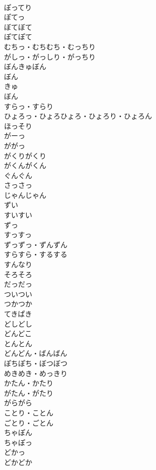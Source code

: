 \documentclass[8pt]{extreport}
\begin{document}
\begin{CJK}{UTF8}{min}
\\	ぽってり	
\\	ぽてっ	
\\	ぼてぼて	
\\	ぽてぽて	
\\	むちっ・むちむち・むっちり	
\\	がしっ・がっしり・がっちり	
\\	ぼんきゅぼん	
\\	ぼん 
\\	きゅ 
\\	ぼん 
\\	すらっ・すらり	
\\	ひょろっ・ひょろひょろ・ひょろり・ひょろん	
\\	ほっそり	
\\	がーっ	
\\	ががっ	
\\	がくりがくり	
\\	がくんがくん	
\\	ぐんぐん	
\\	さっさっ	
\\	じゃんじゃん	
\\	ずい	
\\	すいすい	
\\	ずっ	
\\	すっすっ	
\\	ずっずっ・ずんずん	
\\	すらすら・するする	
\\	すんなり	
\\	そろそろ	
\\	だっだっ	
\\	ついつい	
\\	つかつか	
\\	てきぱき	
\\	どしどし	
\\	どんどこ	
\\	とんとん	
\\	どんどん・ばんばん	
\\	ぽちぽち・ぼつぼつ	
\\	めきめき・めっきり	
\\	かたん・かたり	
\\	がたん・がたり	
\\	がらがら	
\\	ことり・ことん	
\\	ごとり・ごとん	
\\	ちゃぽん	
\\	ちゃぽっ	
\\	どかっ	
\\	どかどか	

\end{CJK}
\end{document}
